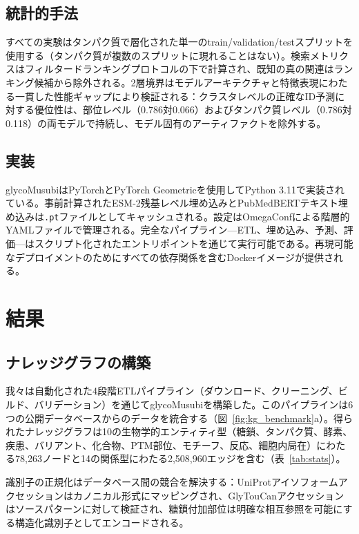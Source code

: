 \documentclass[11pt,a4paper]{ltjsarticle}
\begin{document}
\subsection{統計的手法}

すべての実験はタンパク質で層化された単一のtrain/validation/testスプリットを使用する（タンパク質が複数のスプリットに現れることはない）。検索メトリクスはフィルタードランキングプロトコルの下で計算され、既知の真の関連はランキング候補から除外される。2層境界はモデルアーキテクチャと特徴表現にわたる一貫した性能ギャップにより検証される：クラスタレベルの正確なID予測に対する優位性は、部位レベル（0.786対0.066）およびタンパク質レベル（0.786対0.118）の両モデルで持続し、モデル固有のアーティファクトを除外する。

\subsection{実装}

glycoMusubiはPyTorchとPyTorch Geometricを使用してPython 3.11で実装されている。事前計算されたESM-2残基レベル埋め込みとPubMedBERTテキスト埋め込みは\texttt{.pt}ファイルとしてキャッシュされる。設定はOmegaConfによる階層的YAMLファイルで管理される。完全なパイプライン---ETL、埋め込み、予測、評価---はスクリプト化されたエントリポイントを通じて実行可能である。再現可能なデプロイメントのためにすべての依存関係を含むDockerイメージが提供される。

\section{結果}

\subsection{ナレッジグラフの構築}

我々は自動化された4段階ETLパイプライン（ダウンロード、クリーニング、ビルド、バリデーション）を通じてglycoMusubiを構築した。このパイプラインは6つの公開データベースからのデータを統合する（図~\ref{fig:kg_benchmark}a）。得られたナレッジグラフは10の生物学的エンティティ型（糖鎖、タンパク質、酵素、疾患、バリアント、化合物、PTM部位、モチーフ、反応、細胞内局在）にわたる78,263ノードと14の関係型にわたる2,508,960エッジを含む（表~\ref{tab:stats}）。

識別子の正規化はデータベース間の競合を解決する：UniProtアイソフォームアクセッションはカノニカル形式にマッピングされ、GlyTouCanアクセッションはソースパターンに対して検証され、糖鎖付加部位は明確な相互参照を可能にする構造化識別子としてエンコードされる。
\end{document}
